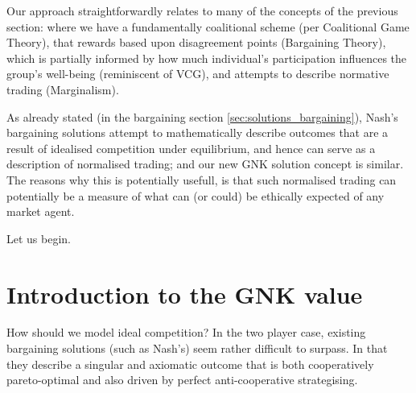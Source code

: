 Our approach straightforwardly relates to many of the concepts of the previous section: where we have a fundamentally coalitional scheme (per Coalitional Game Theory), that rewards based upon disagreement points (Bargaining Theory), which is partially informed by how much individual's participation influences the group's well-being (reminiscent of VCG), and attempts to describe normative trading (Marginalism).

As already stated (in the bargaining section \ref{sec:solutions_bargaining}), Nash's bargaining solutions attempt to mathematically describe outcomes that are a result of idealised competition under equilibrium, and hence can serve as a description of normalised trading;
and our new GNK solution concept is similar.
The reasons why this is potentially usefull, is that such normalised trading can potentially be a measure of what can (or could) be ethically expected of any market agent.



Let us begin.

\section{Introduction to the GNK value}

How should we model ideal competition? In the two player case, existing bargaining solutions (such as Nash's) seem rather difficult to surpass. In that they describe a singular and axiomatic outcome that is both cooperatively pareto-optimal and also driven by perfect anti-cooperative strategising.

